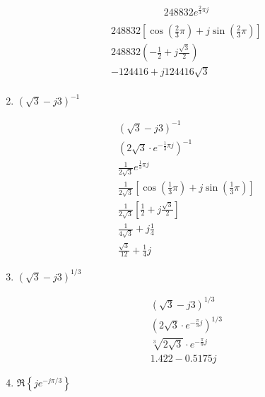 \documentclass{zc-ust-hw}
\begin{document}
\begin{enumerate}
\begin{sol}
\begin{gather}
        \boxed{248832 e^{\frac{2}{3}\pi j}} \\
      \end{gather}
      \begin{gather}
        248832 \left[ \cos \left( \frac{2}{3}\pi \right) + j\sin \left( \frac{2}{3}\pi \right) \right] \\
        248832 \left( -\frac{1}{2} + j \frac{\sqrt{3} }{2} \right) \\
        \boxed{-124416 + j 124416\sqrt{3}} \\
      \end{gather}
    \end{sol}
  \item $(\sqrt{3}-j 3)^{-1}$
    \begin{sol}
      \begin{gather}
        \left( \sqrt{3}-j 3 \right) ^{-1} \\
        \left( 2\sqrt{3} \cdot e^{-\frac{1}{3}\pi j}  \right) ^{-1} \\
        \boxed{
          \frac{1}{2\sqrt{3} } e^{\frac{1}{3}\pi j}
        } \\
        \frac{1}{2\sqrt{3} }\left[ \cos \left( \frac{1}{3}\pi \right) +j\sin \left( \frac{1}{3}\pi  \right)  \right] \\
        \frac{1}{2\sqrt{3} }\left[ \frac{1}{2} +j\frac{\sqrt{3} }{2}  \right] \\
        \frac{1}{4\sqrt{3} }+j \frac{1}{4} \\
        \boxed{
          \frac{\sqrt{3}}{12}+\frac{1}{4}j
        }
      \end{gather}
    \end{sol}
  \item $(\sqrt{3}-j 3)^{1 / 3}$
    \begin{sol}
      \begin{gather}
        \left(\sqrt{3}-j 3\right)^{1 / 3} \\
        \left(2\sqrt{3} \cdot e^{-\frac{\pi}{3}j} \right)^{1 / 3} \\
        \boxed{
          \sqrt[3]{2\sqrt{3}} \cdot e^{-\frac{\pi}{9}j}
        } \\
        \boxed{
          1.422-0.5175j
        }
      \end{gather}
    \end{sol}
    \newpage
  \item $\mathfrak{R}\left\{je^{-j\pi/3}\right\}$
    \begin{sol}
      \begin{gather}

\end{gather}
\end{sol}
\end{enumerate}
\end{document}
